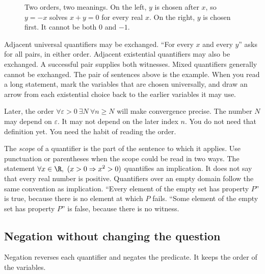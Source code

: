 \begin{figure}[ht]
\centering
{}
\caption{Two orders, two meanings. On the left, $y$ is chosen after $x$, so $y=-x$ solves $x+y=0$ for every real $x$. On the right, $y$ is chosen first. It cannot be both $0$ and $-1$.}
\label{fig:lang-quantifiers}
\end{figure}

Adjacent universal quantifiers may be exchanged. ``For every $x$ and every $y$'' asks for all pairs, in either order. Adjacent existential quantifiers may also be exchanged. A successful pair supplies both witnesses. Mixed quantifiers generally cannot be exchanged. The pair of sentences above is the example. When you read a long statement, mark the variables that are chosen universally, and draw an arrow from each existential choice back to the earlier variables it may use.

Later, the order $\forall\varepsilon>0\ \exists N\ \forall n\ge N$ will make convergence precise. The number $N$ may depend on $\varepsilon$. It may not depend on the later index $n$. You do not need that definition yet. You need the habit of reading the order.

The \emph{scope} of a quantifier is the part of the sentence to which it applies. Use punctuation or parentheses when the scope could be read in two ways. The statement $\forall x\in\R,\ (x>0\Rightarrow x^2>0)$ quantifies an implication. It does not say that every real number is positive. Quantifiers over an empty domain follow the same convention as implication. ``Every element of the empty set has property $P$'' is true, because there is no element at which $P$ fails. ``Some element of the empty set has property $P$'' is false, because there is no witness.

\subsection*{Negation without changing the question}

Negation reverses each quantifier and negates the predicate. It keeps the order of the variables.

